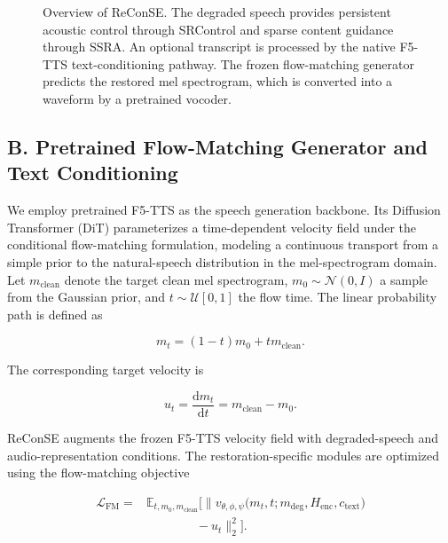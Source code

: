 \documentclass{article}
\begin{document}
\begin{figure}[t]
  \centering
  \caption{Overview of ReConSE. The degraded speech provides persistent acoustic control through SRControl and sparse content guidance through SSRA. An optional transcript is processed by the native F5-TTS text-conditioning pathway. The frozen flow-matching generator predicts the restored mel spectrogram, which is converted into a waveform by a pretrained vocoder.}
  \label{fig:reconse}
\end{figure}

\subsection{B. Pretrained Flow-Matching Generator and Text Conditioning}

We employ pretrained F5-TTS as the speech generation backbone. Its Diffusion Transformer (DiT) parameterizes a time-dependent velocity field under the conditional flow-matching formulation, modeling a continuous transport from a simple prior to the natural-speech distribution in the mel-spectrogram domain. Let $m_{\mathrm{clean}}$ denote the target clean mel spectrogram, $m_0\sim\mathcal{N}(0,I)$ a sample from the Gaussian prior, and $t\sim\mathcal{U}[0,1]$ the flow time. The linear probability path is defined as

\begin{equation}
  m_t=(1-t)m_0+t m_{\mathrm{clean}}.
\end{equation}

The corresponding target velocity is

\begin{equation}
  u_t=\frac{\mathrm{d}m_t}{\mathrm{d}t}=m_{\mathrm{clean}}-m_0.
\end{equation}

ReConSE augments the frozen F5-TTS velocity field with degraded-speech and audio-representation conditions. The restoration-specific modules are optimized using the flow-matching objective

\begin{equation}
\begin{split}
\mathcal{L}_{\mathrm{FM}}
={}&\mathbb{E}_{t,m_0,m_{\mathrm{clean}}}\Big[
\big\|v_{\theta,\phi,\psi}
\big(m_t,t; m_{\mathrm{deg}},H_{\mathrm{enc}},c_{\mathrm{text}}\big)\\
&\qquad\qquad-u_t\big\|_2^2\Big].
\end{split}
\end{equation}
\end{document}
